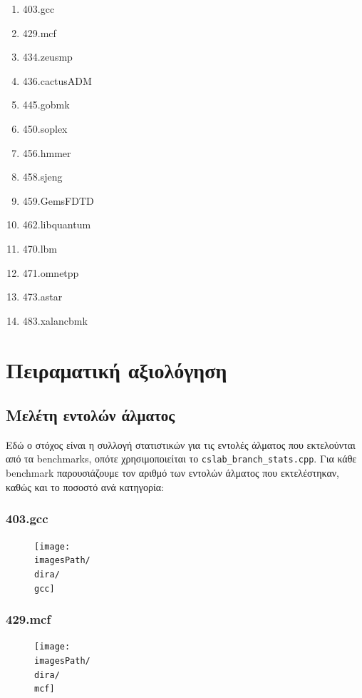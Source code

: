 \documentclass[12pt,a4paper]{article}
\newcommand{\imagesPath}{/home/nick/arch-ntua/ex02/graphs}
\newcommand{\gcc}{403.gcc.cslab_branch_predictors.out.pdf}
\newcommand{\mcf}{429.mcf.cslab_branch_predictors.out.pdf}
\newcommand{\dira}{4.1}
\begin{document}
		\begin{enumerate}
			\item 403.gcc
			\item 429.mcf
			\item 434.zeusmp
			\item 436.cactusADM
			\item 445.gobmk
			\item 450.soplex
			\item 456.hmmer
			\item 458.sjeng
			\item 459.GemsFDTD
			\item 462.libquantum
			\item 470.lbm
			\item 471.omnetpp
			\item 473.astar
			\item 483.xalancbmk
		\end{enumerate}
	
	\section{Πειραματική αξιολόγηση}
		
		\subsection{Μελέτη εντολών άλματος}
			Εδώ ο στόχος είναι η συλλογή στατιστικών για τις εντολές άλματος που εκτελούνται από τα benchmarks, οπότε χρησιμοποιείται το \verb|cslab_branch_stats.cpp|. Για κάθε benchmark παρουσιάζουμε τον αριθμό των εντολών άλματος που εκτελέστηκαν, καθώς και το ποσοστό ανά κατηγορία:
			
			\subsubsection{403.gcc}
				\begin{figure}[H]
					\begin{center} 
						\texttt{[image: \\imagesPath/\\dira/\\gcc]}
					\end{center}
				\end{figure}
			
			\subsubsection{429.mcf}
				\begin{figure}[H]
					\begin{center}
						\texttt{[image: \\imagesPath/\\dira/\\mcf]}
					\end{center}
				\end{figure}
			
\end{document}
